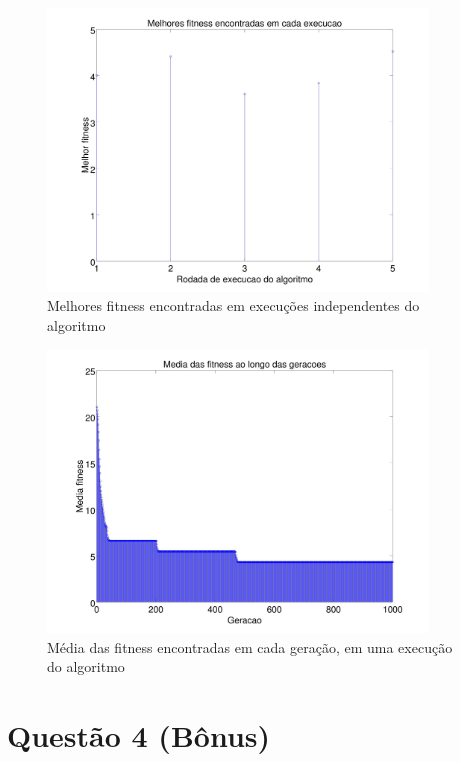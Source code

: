 \documentclass{report}
\begin{document}
	\begin{figure}[H]
		\centering
		\includegraphics[width = 0.9\textwidth]{Q03_melhores_fitness.jpg}
		\caption{Melhores fitness encontradas em execuções independentes do algoritmo}
		\label{melhores_fitness_5_exec_q03}
	\end{figure}
	
	\begin{figure}[H]
		\centering
		\includegraphics[width = 0.9\textwidth]{Q03_media_fitness.jpg}
		\caption{Média das fitness encontradas em cada geração, em uma execução do algoritmo}
		\label{media_fitness_q03}
	
	\end{figure}
	
	\section*{Questão 4 (Bônus)}
	
\end{document}
